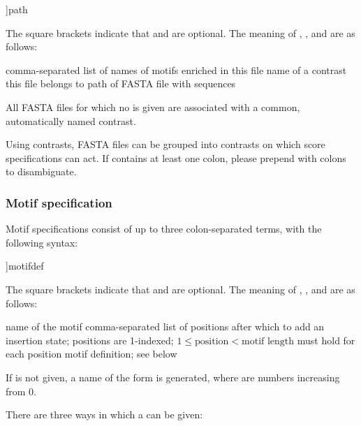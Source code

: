\documentclass[a4paper]{article}
\begin{document}
\begin{verbbox}
[names:[contrast:]]path
\end{verbbox}
\fbox{\theverbbox[t]}

The square brackets indicate that  and  are optional.
The meaning of , , and  are as follows:

\begin{description}
  comma-separated list of names of motifs enriched in this file
  name of a contrast this file belongs to
  path of FASTA file with sequences
\end{description}

All FASTA files for which no  is given are associated with a common, automatically named contrast.

Using contrasts, FASTA files can be grouped into contrasts on which score specifications can act.
If  contains at least one colon, please prepend with colons to disambiguate.

\subsubsection{Motif specification}
\label{section:motif-specification}
Motif specifications consist of up to three colon-separated terms, with the following syntax:

\begin{verbbox}
[name:[insert:]]motifdef
\end{verbbox}
\fbox{\theverbbox[t]}

The square brackets indicate that  and  are optional.
The meaning of , , and  are as follows:

\begin{description}
    name of the motif
    comma-separated list of positions after which to add an insertion state; positions are 1-indexed; $1 \leq \text{position} < \text{motif length}$ must hold for each position
    motif definition; see below
\end{description}

If  is not given, a name of the form  is generated, where  are numbers increasing from 0.

There are three ways in which a  can be given:
\end{document}
